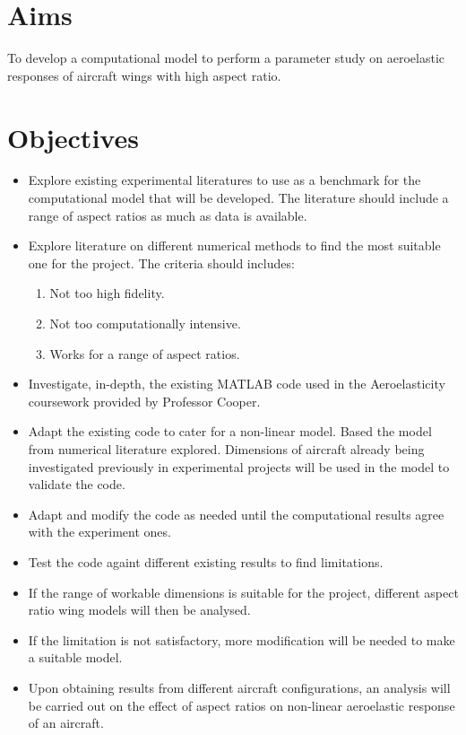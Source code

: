 \documentclass[11pt]{article}
\begin{document}
\section*{Aims}
To develop a computational model to perform a parameter study on aeroelastic responses of aircraft wings with high aspect ratio.

\section*{Objectives} 
\begin{itemize}
    \item Explore existing experimental literatures to use as a benchmark for the computational model that will be developed. The literature should include a range of aspect ratios as much as data is available.
    \item Explore literature on different numerical methods to find the most suitable one for the project. The criteria should includes:
    \begin{enumerate}
        \item Not too high fidelity.
        \item Not too computationally intensive.
        \item Works for a range of aspect ratios.
    \end{enumerate}
    \item Investigate, in-depth, the existing MATLAB code used in the Aeroelasticity coursework provided by Professor Cooper.
    \item Adapt the existing code to cater for a non-linear model. Based the model from numerical literature explored. Dimensions of aircraft already being investigated previously in experimental projects will be used in the model to validate the code.
   \item Adapt and modify the code as needed until the computational results agree with the experiment ones.
    \item Test the code againt different existing results to find limitations.
    \item If the range of workable dimensions is suitable for the project, different aspect ratio wing models will then be analysed.
    \item If the limitation is not satisfactory, more modification will be needed to make a suitable model.
    \item Upon obtaining results from different aircraft configurations, an analysis will be carried out on the effect of aspect ratios on non-linear aeroelastic response of an aircraft.
    
\end{itemize}
\end{document}

